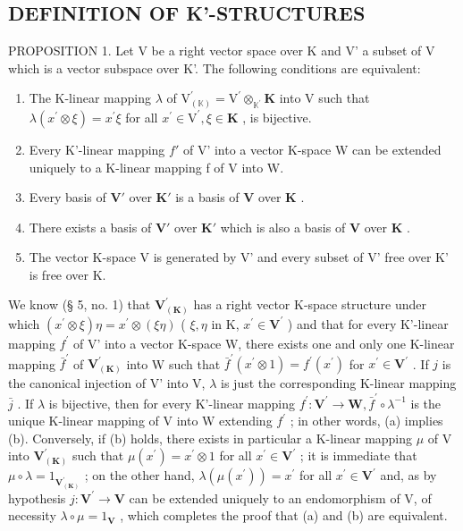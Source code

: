 \subsection{DEFINITION OF K'-STRUCTURES}

PROPOSITION 1. Let V be a right vector space over K and V' a subset of V which is a vector subspace over K'. The following conditions are equivalent:

\begin{enumerate}
\def\labelenumi{(\alph{enumi})}
\item
  The K-linear mapping \(\lambda\) of \(\mathrm{V}_{(\mathbb{K})}^{\prime} = \mathrm{V}^{\prime}\otimes_{\mathbb{K}^{\prime}}\mathbf{K}\) into V such that \(\lambda (x^{\prime}\otimes \xi) = x^{\prime}\xi\) for all \(x^{\prime}\in \mathrm{V}^{\prime},\xi \in \mathbf{K}\) , is bijective.
\item
  Every K'-linear mapping \(f'\) of V' into a vector K-space W can be extended uniquely to a K-linear mapping f of V into W.
\item
  Every basis of \(\mathbf{V}'\) over \(\mathbf{K}'\) is a basis of \(\mathbf{V}\) over \(\mathbf{K}\) .
\item
  There exists a basis of \(\mathbf{V}'\) over \(\mathbf{K}'\) which is also a basis of \(\mathbf{V}\) over \(\mathbf{K}\) .
\item
  The vector K-space V is generated by V' and every subset of V' free over K' is free over K.
\end{enumerate}

We know (§ 5, no. 1) that \(\mathbf{V}_{(\mathbf{K})}^{\prime}\) has a right vector K-space structure under which \((x^{\prime} \otimes \xi)\eta = x^{\prime} \otimes (\xi\eta)\) ( \(\xi, \eta\) in K, \(x^{\prime} \in \mathbf{V}^{\prime}\) ) and that for every K'-linear mapping \(f^{\prime}\) of V' into a vector K-space W, there exists one and only one K-linear mapping \(\bar{f}^{\prime}\) of \(\mathbf{V}_{(\mathbf{K})}^{\prime}\) into W such that \(\bar{f}^{\prime}(x^{\prime} \otimes 1) = f^{\prime}(x^{\prime})\) for \(x^{\prime} \in \mathbf{V}^{\prime}\) . If \(j\) is the canonical injection of V' into V, \(\lambda\) is just the corresponding K-linear mapping \(\bar{j}\) . If \(\lambda\) is bijective, then for every K'-linear mapping \(f^{\prime}: \mathbf{V}^{\prime} \to \mathbf{W}, \bar{f}^{\prime} \circ \lambda^{-1}\) is the unique K-linear mapping of V into W extending \(f^{\prime}\) ; in other words, (a) implies (b). Conversely, if (b) holds, there exists in particular a K-linear mapping \(\mu\) of V into \(\mathbf{V}_{(\mathbf{K})}^{\prime}\) such that \(\mu(x^{\prime}) = x^{\prime} \otimes 1\) for all \(x^{\prime} \in \mathbf{V}^{\prime}\) ; it is immediate that \(\mu \circ \lambda = 1_{\mathbf{V}_{(\mathbf{K})}^{\prime}}\) ; on the other hand, \(\lambda(\mu(x^{\prime})) = x^{\prime}\) for all \(x^{\prime} \in \mathbf{V}^{\prime}\) and, as by hypothesis \(j: \mathbf{V}^{\prime} \to \mathbf{V}\) can be extended uniquely to an endomorphism of V, of necessity \(\lambda \circ \mu = 1_{\mathbf{V}}\) , which completes the proof that (a) and (b) are equivalent.

